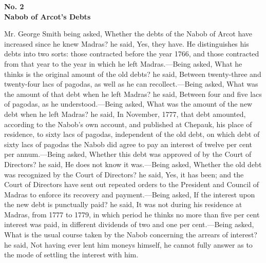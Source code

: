 \PRLsep
\begin{center}
  \textbf{\large No. 2 \\Nabob of Arcot's Debts} \par 
\end{center}




Mr. George Smith being asked, Whether the debts of the Nabob of Arcot have increased since he knew Madras? he said, Yes, they have. He distinguishes his debts into two sorts: those contracted before the year 1766, and those contracted from that year to the year in which he left Madras.—Being asked, What he thinks is the original amount of the old debts? he said, Between twenty-three and twenty-four lacs of pagodas, as well as he can recollect.—Being asked, What was the amount of that debt when he left Madras? he said, Between four and five lacs of pagodas, as he understood.—Being asked, What was the amount of the new debt when he left Madras? he said, In November, 1777, that debt amounted, according to the Nabob's own account, and published at Chepauk, his place of residence, to sixty lacs of pagodas, independent of the old debt, on which debt of sixty lacs of pagodas the Nabob did agree to pay an interest of twelve per cent per annum.—Being asked, Whether this debt was approved of by the Court of Directors? he said, He does not know it was.—Being asked, Whether the old debt was recognized by the Court of Directors? he said, Yes, it has been; and the Court of Directors have sent out repeated orders to the President and Council of Madras to enforce its recovery and payment.—Being asked, If the interest upon the new debt is punctually paid? he said, It was not during his residence at Madras, from 1777 to 1779, in which period he thinks no more than five per cent interest was paid, in different dividends of two and one per cent.—Being asked, What is the usual course taken by the Nabob concerning the arrears of interest? he said, Not having ever lent him moneys himself, he cannot fully answer as to the mode of settling the interest with him.

